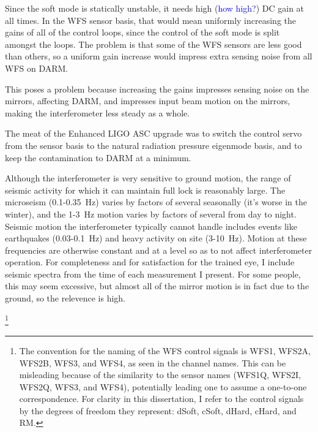 Since the soft mode is statically unstable, it needs high
(\textcolor{blue}{how high?}) DC gain at all times. In the WFS sensor
basis, that would mean uniformly increasing the gains of all of the
control loops, since the control of the soft mode is split amongst the
loops. The problem is that some of the WFS sensors are less good than
others, so a uniform gain increase would impress extra sensing noise
from all WFS on DARM. 

This poses a problem because increasing the gains impresses
sensing noise on the mirrors, affecting DARM, and impresses input beam
motion on the mirrors, making the interferometer less steady as a whole.

The meat of the Enhanced LIGO ASC upgrade was to switch the control servo
from the sensor basis to the natural radiation pressure eigenmode
basis, and to keep the contamination to DARM at a minimum. 


Although the interferometer is very sensitive to ground motion, the
range of seismic activity for which it can maintain full lock is
reasonably large. The microseism (0.1-0.35~Hz) varies by factors of
several seasonally (it's worse in the winter), and the 1-3~Hz motion
varies by factors of several from day to night. Seismic motion the
interferometer typically cannot handle includes events like
earthquakes (0.03-0.1~Hz) and heavy activity on site (3-10~Hz). Motion
at these frequencies are otherwise constant and at a level so as to
not affect interferometer operation. For completeness and for
satisfaction for the trained eye, I include seismic spectra from the
time of each measurement I present. For some people, this may seem
excessive, but almost all of the mirror motion is in fact due to the
ground, so the relevence is high.


\footnote{The convention for the naming of the WFS control signals is
  WFS1, WFS2A, WFS2B, WFS3, and WFS4, as seen in the channel
  names. This can be misleading because of the similarity to the
  sensor names (WFS1Q, WFS2I, WFS2Q, WFS3, and WFS4), potentially
  leading one to assume a one-to-one correspondence. For clarity in
  this dissertation, I refer to the control signals by the degrees of
  freedom they represent: dSoft, cSoft, dHard, cHard, and RM.}





